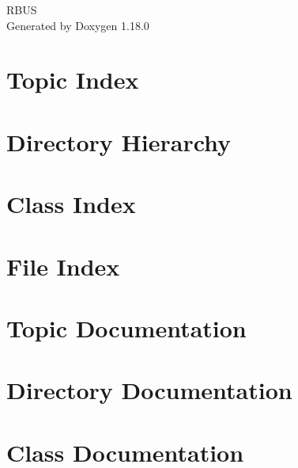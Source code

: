 \documentclass[twoside]{book}
\newcommand{\+}{\discretionary{\mbox{\scriptsize$\hookleftarrow$}}{}{}}
\newcommand{\clearemptydoublepage}{%
    \newpage{\pagestyle{empty}\cleardoublepage}%
  }
\begin{document}
  \raggedbottom
    \hypersetup{pageanchor=false,
                bookmarksnumbered=true,
                pdfencoding=unicode
               }
  \begin{titlepage}
  \vspace*{7cm}
  \begin{center}%
  {\Large RBUS}\\
  \vspace*{1cm}
  {\large Generated by Doxygen 1.18.0}\\
  \end{center}
  \end{titlepage}
  \clearemptydoublepage
  \tableofcontents
  \clearemptydoublepage
  \hypersetup{pageanchor=true}

\chapter{Topic Index}

\chapter{Directory Hierarchy}

\chapter{Class Index}

\chapter{File Index}

\chapter{Topic Documentation}










\chapter{Directory Documentation}


\chapter{Class Documentation}



















\end{document}
